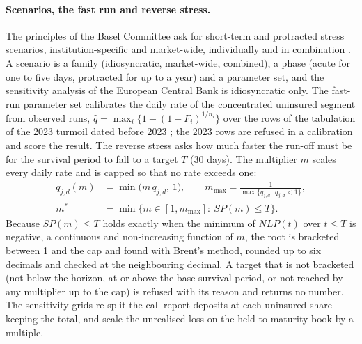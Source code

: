 \paragraph{Scenarios, the fast run and reverse stress.}
The principles of the Basel Committee ask for short-term and protracted stress scenarios, institution-specific and market-wide, individually and in combination \citep{alm:bcbs2008}. A scenario is a family (idiosyncratic, market-wide, combined), a phase (acute for one to five days, protracted for up to a year) and a parameter set, and the sensitivity analysis of the European Central Bank is idiosyncratic only. The fast-run parameter set calibrates the daily rate of the concentrated uninsured segment from observed runs, $\hat q=\max_i\{1-(1-F_i)^{1/n_i}\}$ over the rows of the tabulation of the 2023 turmoil dated before 2023 \citep{alm:bcbs2023}; the 2023 rows are refused in a calibration and score the result. The reverse stress asks how much faster the run-off must be for the survival period to fall to a target $T$ (30 days). The multiplier $m$ scales every daily rate and is capped so that no rate exceeds one:
\begin{align}
q_{j,d}(m)&=\min\big(m\,q_{j,d},\,1\big),\qquad m_{\max}=\frac{1}{\max\{q_{j,d}:\ q_{j,d}<1\}},\label{eq:alm-reverse}\\
m^{*}&=\min\{m\in[1,m_{\max}]:\ SP(m)\le T\}.\label{eq:alm-mstar}
\end{align}
Because $SP(m)\le T$ holds exactly when the minimum of $NLP(t)$ over $t\le T$ is negative, a continuous and non-increasing function of $m$, the root is bracketed between 1 and the cap and found with Brent's method, rounded up to six decimals and checked at the neighbouring decimal. A target that is not bracketed (not below the horizon, at or above the base survival period, or not reached by any multiplier up to the cap) is refused with its reason and returns no number. The sensitivity grids re-split the call-report deposits at each uninsured share keeping the total, and scale the unrealised loss on the held-to-maturity book by a multiple.

